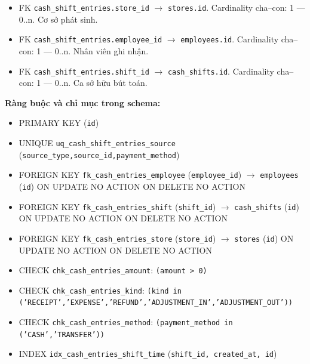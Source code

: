 \begin{itemize}

\item FK \texttt{cash\_shift\_entries.store\_id} $\rightarrow$ \texttt{stores.id}. Cardinality cha--con: 1 — 0..n. Cơ sở phát sinh.

\item FK \texttt{cash\_shift\_entries.employee\_id} $\rightarrow$ \texttt{employees.id}. Cardinality cha--con: 1 — 0..n. Nhân viên ghi nhận.

\item FK \texttt{cash\_shift\_entries.shift\_id} $\rightarrow$ \texttt{cash\_shifts.id}. Cardinality cha--con: 1 — 0..n. Ca sở hữu bút toán.

\end{itemize}

\textbf{Ràng buộc và chỉ mục trong schema:}

\begin{itemize}

\item PRIMARY KEY (\texttt{id})

\item UNIQUE \texttt{uq\_cash\_shift\_entries\_source} (\texttt{source\_type,source\_id,payment\_method})

\item FOREIGN KEY \texttt{fk\_cash\_entries\_employee} (\texttt{employee\_id}) $\rightarrow$ \texttt{employees} (\texttt{id}) ON UPDATE NO ACTION ON DELETE NO ACTION

\item FOREIGN KEY \texttt{fk\_cash\_entries\_shift} (\texttt{shift\_id}) $\rightarrow$ \texttt{cash\_shifts} (\texttt{id}) ON UPDATE NO ACTION ON DELETE NO ACTION

\item FOREIGN KEY \texttt{fk\_cash\_entries\_store} (\texttt{store\_id}) $\rightarrow$ \texttt{stores} (\texttt{id}) ON UPDATE NO ACTION ON DELETE NO ACTION

\item CHECK \texttt{chk\_cash\_entries\_amount}: \texttt{(amount > 0)}

\item CHECK \texttt{chk\_cash\_entries\_kind}: \texttt{(kind in ('RECEIPT','EXPENSE','REFUND','ADJUSTMENT\_IN','ADJUSTMENT\_OUT'))}

\item CHECK \texttt{chk\_cash\_entries\_method}: \texttt{(payment\_method in ('CASH','TRANSFER'))}

\item INDEX \texttt{idx\_cash\_entries\_shift\_time} (\texttt{shift\_id, created\_at, id})

\end{itemize}

